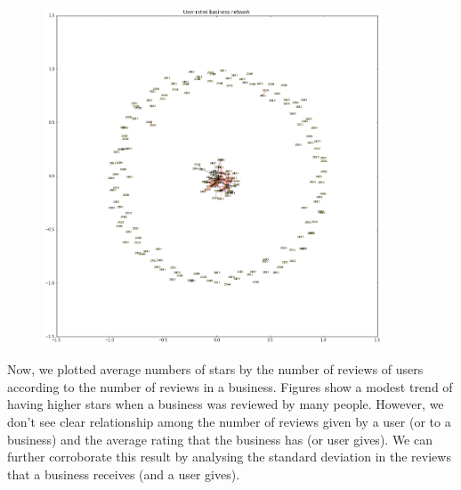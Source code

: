 \documentclass[11pt]{article}
\begin{document}
\begin{figure}[H]
\centering
\includegraphics[width=0.9\textwidth]{./ac209/networkanalysis.png}
\end{figure}


\par Now, we plotted average numbers of stars by the number of reviews of users according to the number of reviews in a business. Figures show a modest trend of having higher stars when a business was reviewed by many people. However, we don't see clear relationship among the number of reviews given by a user (or to a business) and the average rating that the business has (or user gives). We can further corroborate this result by analysing the standard deviation in the reviews that a business receives (and a user gives).
\end{document}
